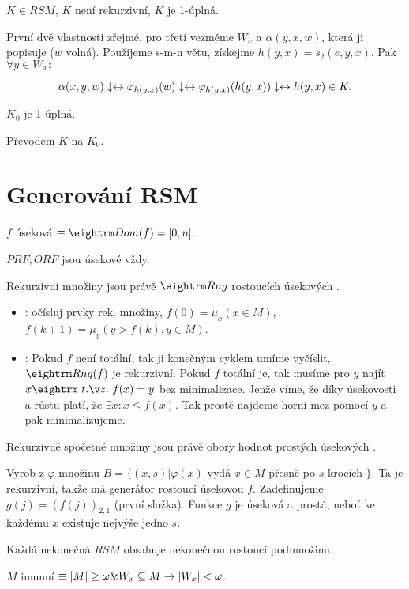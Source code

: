 \begin{multicols}{3}
 $K \in RSM$, $K$ není rekurzivní, $K$ je 1-úplná.

\prf{} První dvě vlastnosti zřejmé, pro třetí vezměme $W_x$ a $\alpha(y,x,w)$,
která ji popisuje ($w$ volná). Použijeme s-m-n větu, získejme $h(y,x) = s_2(e,y,x)$. Pak
$\forall y \in W_x:$

$$ \alpha(x,y,w)\downarrow \leftrightarrow \varphi_{h(y,x)}(w)\downarrow \leftrightarrow  \varphi_{h(y,x)}(h(y,x))\downarrow \leftrightarrow h(y,x) \in K.$$

 $K_0$ je 1-úplná.

\prf{} Převodem $K$ na $K_0$.

\section{Generování RSM}

\dfn{} $f$ úseková $\equiv \dom(f) = [0,n]$.

\obs{} $PRF, ORF$ jsou úsekové vždy.

 Rekurzivní množiny jsou právě $\rng$ rostoucích úsekových \CRF. 

\prf{}

\begin{itemize}
\item \uv{$\then$}: očísluj prvky rek. množiny, $f(0) = \mu_x(x \in M)$, $f(k+1) = \mu_y(y > f(k), y \in M)$.
\item \uv{$\leftarrow$}: Pokud $f$ není totální, tak ji konečným cyklem umíme
vyčíslit, $\rng(f)$ je rekurzivní.  Pokud $f$ totální je, tak musíme pro $y$
najít $x \st f(x) = y$ bez minimalizace. Jenže víme, že díky úsekovosti a růstu
platí, že $\exists x: x \le f(x)$. Tak prostě najdeme horní mez pomocí $y$ a
pak minimalizujeme.
\end{itemize}

\thm{} Rekurzivně spočetné množiny jsou právě obory hodnot prostých úsekových \CRF.

\prf{} Vyrob z $\varphi$ množinu $B = \{(x,s) | \varphi(x)$ vydá $x \in M$ přesně po $s$ krocích $\}$.
Ta je rekurzivní, takže má generátor rostoucí úsekovou $f$. Zadefinujeme $g(j) = (f(j))_{2,1}$
(první složka). Funkce $g$ je úseková a prostá, neboť ke každému $x$ existuje nejvýše jedno $s$.

\thm{} Každá nekonečná $RSM$ obsahuje nekonečnou rostoucí podmnožinu.
 

\dfn{} $M$ imunní $\equiv |M| \ge \omega \& W_x \subseteq M \rightarrow |W_x| < \omega$. 


\end{multicols}
